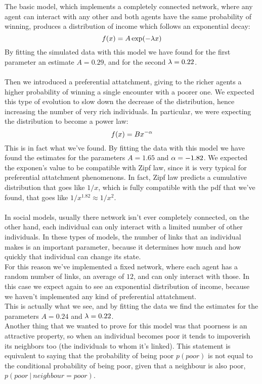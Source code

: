 The basic model, which implements a completely connected network, where any agent can interact with any other and both agents have the same probability of winning, produces a distribution of income which follows an exponential decay:
$$
	f(x) = A\exp(-\lambda x)
$$
By fitting the simulated data with this model we have found for the first parameter an estimate $A = 0.29$, and for the second $\lambda = 0.22$. \\ \\
Then we introduced a preferential attatchment, giving to the richer agents a higher probability of winning a single encounter with a poorer one. We expected this type of evolution to slow down the decrease of the distribution, hence increasing the number of very rich individuals. In particular, we were expecting the distribution to become a power law:
$$
	f(x) = Bx^{-\alpha}
$$
This is in fact what we've found. By fitting the data with this model we have found the estimates for the parameters $A = 1.65$ and $\alpha = -1.82$. We expected the exponen's value to be compatible with Zipf law, since it is very typical for preferential attatchment phenomenons. In fact, Zipf law predicts a cumulative distribution that goes like $1/x$, which is fully compatible with the pdf that we've found, that goes like $1/x^{1.82} \approx 1/x^{2}$. \\ \\
In social models, usually there network isn't ever completely connected, on the other hand, each individual can only interact with a limited number of other individuals. In these types of models, the number of links that an individual makes is an important parameter, because it determines how much and how quickly that individual can change its state. \\
For this reason we've implemented a fixed network, where each agent has a random number of links, an average of $12$, and can only interact with those. In this case we expect again to see an exponential distribution of income, because we haven't implemented any kind of preferential attatchment. \\
This is actually what we see, and by fitting the data we find the estimates for the parameters $A = 0.24$ and $\lambda = 0.22$. \\
Another thing that we wanted to prove for this model was that poorness is an attractive property, so when an individual becomes poor it tends to impoverish its neighbors too (the individuals to whom it's linked). This statement is equivalent to saying that the probability of being poor $p(poor)$ is not equal to the conditional probability of being poor, given that a neighbour is also poor, $p(poor \ | \ neighbour=poor)$. \\

